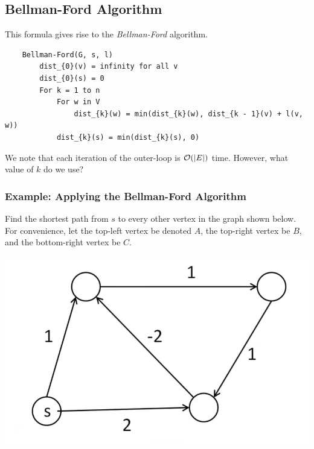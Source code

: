 \documentclass[letterpaper]{article}
\begin{document}
\subsection{Bellman-Ford Algorithm}
This formula gives rise to the \emph{Bellman-Ford} algorithm. 
\begin{verbatim}
    Bellman-Ford(G, s, l)
        dist_{0}(v) = infinity for all v 
        dist_{0}(s) = 0
        For k = 1 to n
            For w in V
                dist_{k}(w) = min(dist_{k}(w), dist_{k - 1}(v) + l(v, w))
            dist_{k}(s) = min(dist_{k}(s), 0)
\end{verbatim}
We note that each iteration of the outer-loop is $\mathcal{O}(|E|)$ time. However, what value of $k$ do we use? 

\subsubsection{Example: Applying the Bellman-Ford Algorithm}
Find the shortest path from $s$ to every other vertex in the graph shown below. For convenience, let the top-left vertex be denoted $A$, the top-right vertex be $B$, and the bottom-right vertex be $C$. 
\begin{center}
    \includegraphics[scale=0.4]{../assets/shortest_path_problem.png}
\end{center}
\end{document}
